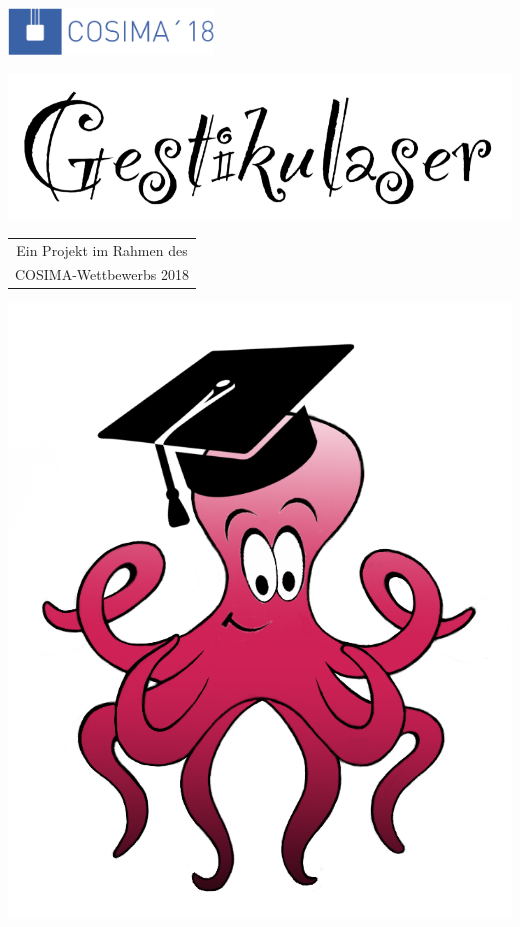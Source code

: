 \documentclass[a4paper,12pt,notumble]{leaflet}
\begin{document}
\begin{center}

\includegraphics[height=1.25cm]{../Logos/Cosima18.png}

\vfill

\includegraphics[scale=0.25]{../Logos/GestikulaserSchriftzugOhneHut.png}

\vfill

\normalsize

\begin{tabular}{c}
	Ein Projekt im Rahmen des \\
	COSIMA-Wettbewerbs 2018
\end{tabular}

\vfill
\includegraphics[scale=0.25]{../Logos/GestikulaserLogoBuntOhneSchrift.png}
\vfill


\end{center}
\end{document}
